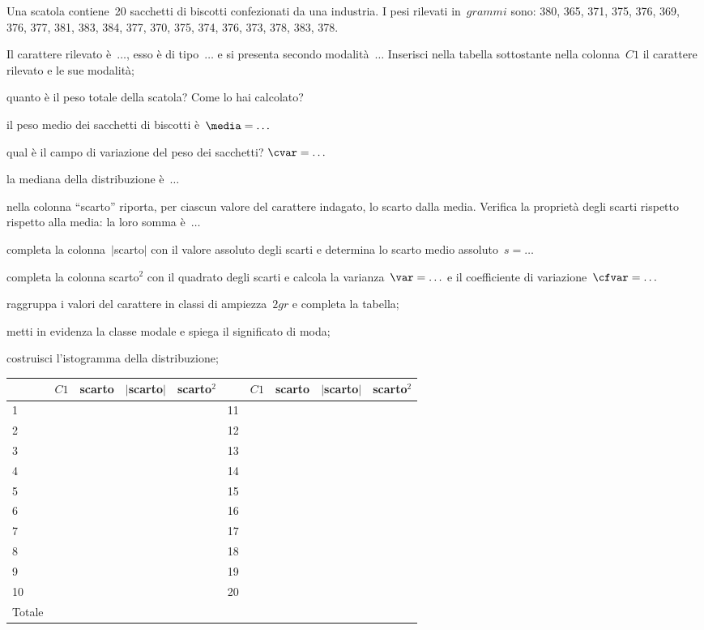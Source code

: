 \begin{esercizio}
\label{ese:A.46}
Una scatola contiene~20 sacchetti di biscotti confezionati da una 
industria. I pesi rilevati in~$\unit{grammi}$ sono:
380, 365, 371, 375, 376, 369, 376, 377, 381, 383, 384, 377, 370, 375, 374, 
376, 373, 378, 383, 378.
\begin{enumeratea}
 \item Il carattere rilevato è~$\ldots$, esso è di tipo~$\ldots$ e si 
presenta secondo modalità~$\ldots$
 Inserisci nella tabella sottostante nella colonna~$C1$ il carattere 
rilevato e le sue modalità;
 \item quanto è il peso totale della scatola? Come lo hai calcolato?
 \item il peso medio dei sacchetti di biscotti è~$\media = \ldots$
 \item qual è il campo di variazione del peso dei sacchetti? $\cvar = 
\ldots$
 \item la mediana della distribuzione è~$\ldots$
 \item nella colonna ``scarto'' riporta, per ciascun valore del carattere 
indagato, lo scarto dalla media.
 Verifica la proprietà degli scarti rispetto rispetto alla media: la loro 
somma è~$\ldots$
 \item completa la colonna~$\vert$scarto$\vert$ con il valore assoluto 
degli scarti e determina lo scarto medio assoluto~$s = \dots$
 \item completa la colonna scarto$^2$ con il quadrato degli scarti e 
calcola la varianza~$\var = \ldots$ e
 il coefficiente di variazione~$\cfvar = \ldots$
 \item raggruppa i valori del carattere in classi di ampiezza~$2 \unit{gr}$ 
e completa la tabella;
 \item metti in evidenza la classe modale e spiega il significato di moda;
 \item costruisci l'istogramma della distribuzione;

\begin{center}
\begin{tabular}{*{2}{lcccc}}
\toprule
 & $C1$ & scarto &$\vert$scarto$\vert$ &scarto$^2$& & $C1$ & scarto 
&$\vert$scarto$\vert$ &scarto$^2$\\
\midrule
1 & & & & &11 & & & &\\
2 & & & & &12 & & & &\\
3 & & & & &13 & & & &\\
4 & & & & &14 & & & &\\
5 & & & & &15 & & & &\\
6 & & & & &16 & & & &\\
7 & & & & &17 & & & &\\
8 & & & & &18 & & & &\\
9 & & & & &19 & & & &\\
10 & & & & &20 & & & &\\
\midrule
Totale & & & &&&&\\
\bottomrule
\end{tabular}
\end{center}

\end{enumeratea}
\end{esercizio}

